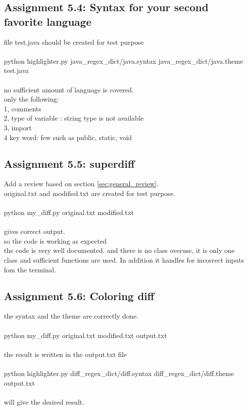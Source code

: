 \documentclass[a4paper]{article}
\begin{document}
\subsection*{Assignment 5.4: Syntax for your second favorite language}

file test.java should be created for test purpose \\
\\
python highlighter.py java\_regex\_dict/java.syntax java\_regex\_dict/java.theme test.java\\
\\
no sufficient amount of language is covered. \\
only the following: \\
1, comments\\
2, type of variable : string type  is not available \\
3, import\\
4 key word: few such as public, static, void \\



\subsection*{Assignment 5.5: superdiff}
Add a review based on section \ref{sec:general_review}. \\
original.txt and modified.txt are created for test purpose.\\
\\
python my\_diff.py original.txt modified.txt \\
\\
gives correct output.\\
so the code is working as expected\\
the code is very well documented. and there is no class overuse, it is only one class and sufficient functions are used. In addition it handles for incorrect inputs fom the terminal.


\subsection*{Assignment 5.6:  Coloring diff}
the syntax and the theme are correctly done.\\
\\
python my\_diff.py original.txt modified.txt output.txt \\
\\
the result is written in the output.txt file\\
\\
python highlighter.py diff\_regex\_dict/diff.syntax diff\_regex\_dict/diff.theme output.txt\\
\\
will give the desired result.\\





\end{document}
